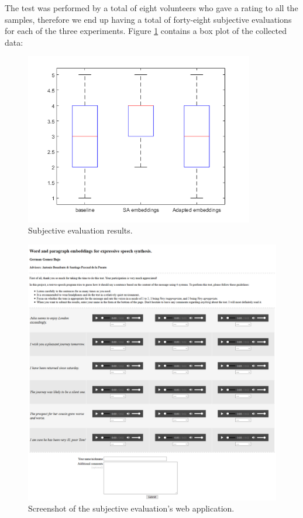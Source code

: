 The test was performed by a total of eight volunteers who gave a rating to all the samples, therefore we end up having a total of forty-eight subjective evaluations for each of the three experiments. Figure \ref{fig:boxplot0} contains a box plot of the collected data:

\begin{figure}[h]
    \centering
    \includegraphics[width=10cm]{figures/box0}
    \caption{Subjective evaluation results.}
    \label{fig:boxplot0}
\end{figure}

\begin{figure}
    \centering
    \includegraphics[width=16cm]{figures/webapp}
    \caption{Screenshot of the subjective evaluation's web application.}
    \label{fig:webapp}
\end{figure}
